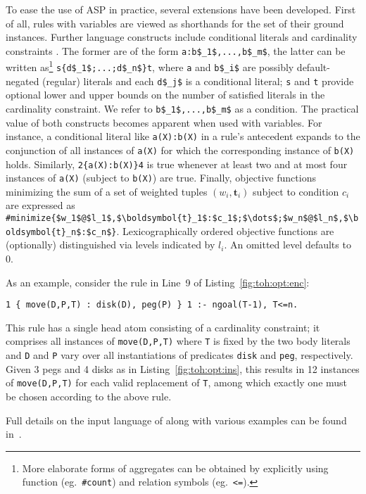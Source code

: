 To ease the use of ASP in practice, 
several extensions have been developed. 
First of all, rules with variables are viewed as shorthands for the set of their ground instances.
Further language constructs include
{conditional literals} and {cardinality constraints} \cite{siniso02a}.
The former are of the form
\lstinline[mathescape]{a:b$_1$,...,b$_m$},
the latter can be written as\footnote{More elaborate forms of aggregates can be obtained by explicitly using function (eg.\ \texttt{\#count}) and
  relation symbols (eg.\ \texttt{<=}).}
\lstinline[mathescape]+s{d$_1$;...;d$_n$}t+,
where \lstinline{a} and \lstinline[mathescape]{b$_i$} are possibly default-negated (regular) literals  %
and each \lstinline[mathescape]{d$_j$} is a conditional literal; %
\lstinline{s} and \lstinline{t} provide optional lower and upper bounds on the number of satisfied literals in the cardinality constraint.
We refer to \lstinline[mathescape]{b$_1$,...,b$_m$} as a {condition}.
%
The practical value of both constructs becomes apparent when used with variables.
For instance, a conditional literal like
\lstinline[mathescape]{a(X):b(X)}
in a rule's antecedent expands to the conjunction of all instances of \lstinline{a(X)} for which the corresponding instance of \lstinline{b(X)} holds.
%
Similarly,
\lstinline[mathescape]+2{a(X):b(X)}4+
is true whenever at least two and at most four instances of \lstinline{a(X)} (subject to \lstinline{b(X)}) are true.
%
Finally, objective functions minimizing the sum of a set of weighted tuples $(w_i,\boldsymbol{t}_i)$ subject to condition $c_i$ are expressed as
\lstinline[mathescape]!#minimize{$w_1$@$l_1$,$\boldsymbol{t}_1$:$c_1$;$\dots$;$w_n$@$l_n$,$\boldsymbol{t}_n$:$c_n$}!.
Lexicographically ordered objective functions are (optionally) distinguished via levels indicated by $l_i$.
An omitted level defaults to 0.

As an example, consider the rule in Line~9 of Listing~\ref{fig:toh:opt:enc}:
\begin{lstlisting}[numbers=none,basicstyle=\ttfamily\small]
1 { move(D,P,T) : disk(D), peg(P) } 1 :- ngoal(T-1), T<=n.
\end{lstlisting}
This rule has a single head atom consisting of a cardinality constraint;
it comprises all instances of \lstinline{move(D,P,T)} where \lstinline{T} is fixed by the two body literals and \lstinline{D} and \lstinline{P} vary
over all instantiations of predicates \lstinline{disk} and \lstinline{peg}, respectively.
Given 3 pegs and 4 disks as in Listing~\ref{fig:toh:opt:ins}, this results in 12 instances of \lstinline{move(D,P,T)} for each valid replacement of
\lstinline{T}, among which exactly one must be chosen according to the above rule.

Full details on the input language of \clingo{} along with various examples can be found in~\cite{PotasscoUserGuide}.

